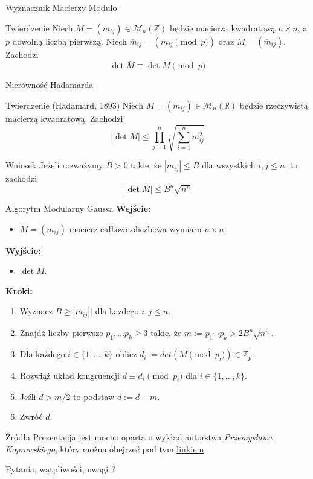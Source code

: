 \documentclass{beamer}
\begin{document}
\begin{frame}{Wyznacznik Macierzy Modulo}
    \begin{block}{Twierdzenie}
        Niech $M = (m_{ij})\in \mathcal{M}_n(\mathbb{Z})$ będzie macierza kwadratową $n \times n$, a $p$ dowolną liczbą pierwszą.
        Niech $\overline{m}_{ij} = (m_{ij} \pmod{p})$ oraz $\overline{M} = (\overline{m}_{ij})$. Zachodzi 
        $$\det \overline{M} \equiv \det M \pmod{p}$$
    \end{block}
\end{frame}

\begin{frame}{Nierówność Hadamarda}
    \begin{block}{Twierdzenie (Hadamard, 1893)}
        Niech $M = (m_{ij}) \in \mathcal{M}_n(\mathbb{R})$ będzie rzeczywistą macierzą kwadratową. Zachodzi 
        $$ |\det M | \leq \prod_{j=1}^{n}\sqrt{\sum_{i=1}^{n}m_{ij}^{2}}$$
    \end{block}
    \pause 
    \begin{alertblock}{Wniosek}
        Jeżeli rozważymy $B > 0$ takie, że $ | m_{ij} | \leq B$ dla wszystkich $i,j \leq n$, to zachodzi 
        $$ | \det M| \leq B^n \sqrt{n^n}$$ 
    \end{alertblock}
\end{frame}

\begin{frame}{Algorytm Modularny Gaussa}
    \textbf{Wejście:}
    \begin{itemize}
        \item $M = (m_{ij})$ macierz  całkowitoliczbowa wymiaru $n \times n$.
    \end{itemize}
    \textbf{Wyjście:}
    \begin{itemize}
        \item $\det M$.
    \end{itemize}
    \textbf{Kroki:}
    \begin{enumerate}
        \item Wyznacz $B \geq |m_{ij}||$ dla każdego $i,j \leq n$. 
        \item Znajdź liczby pierwsze $p_1, \ldots p_k \geq 3$ takie, że $m := p_1 \cdots p_k > 2B^n\sqrt{n^n}$.
        \item Dla każdego $i \in \{1, \ldots, k\}$ oblicz $d_i := det(M \pmod{p_i}) \in \mathbb{Z}_p$.
        \item Rozwiąż układ kongruencji $d \equiv d_i \pmod{p_i}$ dla $i \in \{1,\ldots,k\}$.
        \item Jeśli $d > m/2$ to podstaw $d := d-m$.
        \item Zwróć $d$. 
    \end{enumerate}
\end{frame}
\begin{frame}{Źródła}
    Prezentacja jest mocno oparta o wykład autorstwa \textit{Przemysława Koprowskiego}, który można obejrzeć pod tym 
    \href{https://www.youtube.com/watch?v=O4e0N-0glUw}{linkiem}
    \printbibliography
\end{frame}

\begin{frame}
    \centering 
    \LARGE Pytania, wątpliwości, uwagi ? 
\end{frame}
\end{document}
